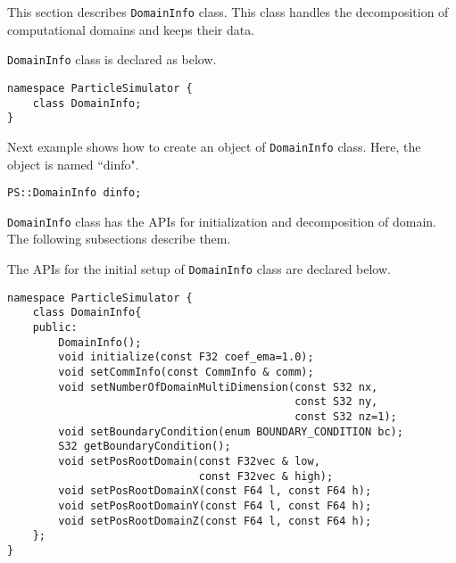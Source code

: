 
This section describes {\tt DomainInfo} class. This class handles
the decomposition of computational domains and keeps their data.



{\tt DomainInfo} class is declared as below.

\begin{lstlisting}[caption=DomainInfo0]
namespace ParticleSimulator {
    class DomainInfo;
}
\end{lstlisting}


Next example shows how to create an object of {\tt DomainInfo} class.
Here, the object is named ``dinfo".

\begin{screen}
\begin{verbatim}
PS::DomainInfo dinfo;
\end{verbatim}
\end{screen}




{\tt DomainInfo} class has the APIs for initialization and
decomposition of domain. The following subsections describe them.



The APIs for the initial setup of {\tt DomainInfo} class are declared
below.

\begin{lstlisting}[caption=DomainInfo1]
namespace ParticleSimulator {
    class DomainInfo{
    public:
        DomainInfo();
        void initialize(const F32 coef_ema=1.0);
        void setCommInfo(const CommInfo & comm);
        void setNumberOfDomainMultiDimension(const S32 nx,
                                             const S32 ny,
                                             const S32 nz=1);
        void setBoundaryCondition(enum BOUNDARY_CONDITION bc);
        S32 getBoundaryCondition();
        void setPosRootDomain(const F32vec & low,
                              const F32vec & high);
        void setPosRootDomainX(const F64 l, const F64 h);
        void setPosRootDomainY(const F64 l, const F64 h);
        void setPosRootDomainZ(const F64 l, const F64 h);
    };
}
\end{lstlisting}

